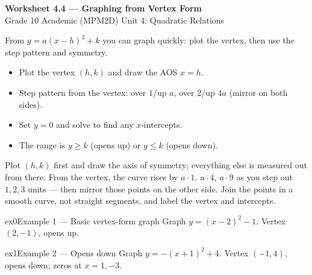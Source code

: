 \documentclass[11pt]{article}
\begin{document}
\begin{center}
{\LARGE\bfseries\color{titleblue}Worksheet 4.4 --- Graphing from Vertex Form}\\[2pt]
{\small Grade 10 Academic (MPM2D) \textperiodcentered{} Unit 4: Quadratic Relations}
\end{center}

\begin{ideabox}
From $y=a(x-h)^2+k$ you can graph quickly: plot the vertex, then use the step pattern and symmetry.
\begin{itemize}[leftmargin=*,itemsep=2pt]
  \item Plot the vertex $(h,k)$ and draw the AOS $x=h$.
  \item Step pattern from the vertex: over $1$/up $a$, over $2$/up $4a$ (mirror on both sides).
  \item Set $y=0$ and solve to find any $x$-intercepts.
  \item The range is $y\ge k$ (opens up) or $y\le k$ (opens down).
\end{itemize}
\end{ideabox}

\begin{learnbox}
Plot $(h,k)$ first and draw the axis of symmetry; everything else is measured out from there.
From the vertex, the curve rises by $a\cdot1,\ a\cdot4,\ a\cdot9$ as you step out $1,2,3$ units — then mirror those points on the other side.
Join the points in a smooth curve, not straight segments, and label the vertex and intercepts.
\end{learnbox}


\begin{example}{ex0}{Example 1 --- Basic vertex-form graph}
Graph $y=(x-2)^2-1$.
\soln Vertex $(2,-1)$, opens up.
\end{example}

\begin{example}{ex1}{Example 2 --- Opens down}
Graph $y=-(x+1)^2+4$.
\soln Vertex $(-1,4)$, opens down; zeros at $x=1,-3$.
\end{example}
\end{document}
